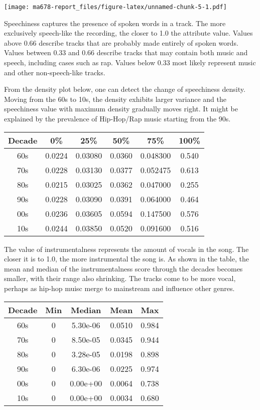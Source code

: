 \documentclass[]{article}
\begin{document}
\texttt{[image: ma678-report\_files/figure-latex/unnamed-chunk-5-1.pdf]}

Speechiness captures the presence of spoken words in a track. The more
exclusively speech-like the recording, the closer to 1.0 the attribute
value. Values above 0.66 describe tracks that are probably made entirely
of spoken words. Values between 0.33 and 0.66 describe tracks that may
contain both music and speech, including cases such as rap. Values below
0.33 most likely represent music and other non-speech-like tracks.

From the density plot below, one can detect the change of speechiness
density. Moving from the 60s to 10s, the density exhibits larger
variance and the speechiness value with maximum density gradually moves
right. It might be explained by the prevalence of Hip-Hop/Rap music
starting from the 90s.

\hypertarget{htmlwidget-5c3ea36c794aed241581}{}

\begin{table}[H]
\centering
\begin{tabular}{cccccc}
\toprule
Decade & 0\% & 25\% & 50\% & 75\% & 100\%\\
\midrule
60s & 0.0224 & 0.03080 & 0.0360 & 0.048300 & 0.540\\
70s & 0.0228 & 0.03130 & 0.0377 & 0.052475 & 0.613\\
80s & 0.0215 & 0.03025 & 0.0362 & 0.047000 & 0.255\\
90s & 0.0228 & 0.03090 & 0.0391 & 0.064000 & 0.464\\
00s & 0.0236 & 0.03605 & 0.0594 & 0.147500 & 0.576\\
\addlinespace
10s & 0.0244 & 0.03850 & 0.0520 & 0.091600 & 0.516\\
\bottomrule
\end{tabular}
\end{table}

The value of instrumentalness represents the amount of vocals in the
song. The closer it is to 1.0, the more instrumental the song is. As
shown in the table, the mean and median of the instrumentalness score
through the decades becomes smaller, with their range also shrinking.
The tracks come to be more vocal, perhaps as hip-hop muisc merge to
mainstream and influence other genres.

\begin{table}[H]
\centering
\begin{tabular}{ccccc}
\toprule
Decade & Min & Median & Mean & Max\\
\midrule
60s & 0 & 5.30e-06 & 0.0510 & 0.984\\
70s & 0 & 8.50e-05 & 0.0345 & 0.944\\
80s & 0 & 3.28e-05 & 0.0198 & 0.898\\
90s & 0 & 6.30e-06 & 0.0225 & 0.974\\
00s & 0 & 0.00e+00 & 0.0064 & 0.738\\
\addlinespace
10s & 0 & 0.00e+00 & 0.0034 & 0.680\\
\bottomrule
\end{tabular}
\end{table}
\end{document}
